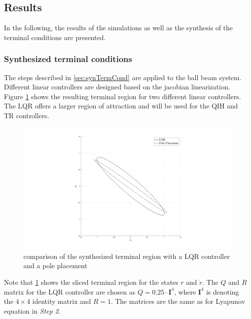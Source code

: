 \documentclass[10pt,a4paper,titlepage]{article}
\begin{document}
\subsection{Results}
In the following, the results of the simulations as well as the synthesis of the terminal conditions are presented.

\subsubsection*{Synthesized terminal conditions}
The steps described in \ref{sec:synTermCond} are applied to the ball beam system. Different linear controllers are designed based on the jacobian linearization.
Figure \ref{pic:LQRvsPole} shows the resulting terminal region for two different linear controllers. The LQR offers a larger region of attraction and will be used
for the QIH and TR controllers.

\begin{figure}[h]
	\begin{center}
		\includegraphics[width=\textwidth]{img/lqr_vs_pole.png}
		\caption{comparison of the synthesized terminal region with a LQR controller and a pole placement}
		\label{pic:LQRvsPole}
	\end{center}
\end{figure}

Note that \ref{pic:LQRvsPole} shows the sliced terminal region for the states $r$ and $\dot{r}$. The $Q$ and $R$ matrix for the LQR controller are chosen
as $Q = 0.25 \cdot \mathbf{I}^4$, where $\mathbf{I}^4$ is denoting the $4\times 4$ identity matrix and $R = 1$. The matrices are the same as for Lyapunov
equation in \textit{Step 2}.
\end{document}
